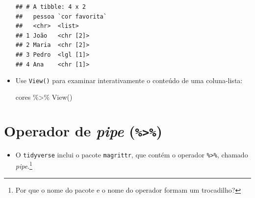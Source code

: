 \documentclass[
  11pt]{report}
\newenvironment{Shaded}{\begin{snugshade}}{\end{snugshade}}
\newcommand{\FunctionTok}[1]{\textcolor[rgb]{0.00,0.00,0.00}{#1}}
\newcommand{\NormalTok}[1]{#1}
\newcommand{\SpecialCharTok}[1]{\textcolor[rgb]{0.00,0.00,0.00}{#1}}
\providecommand{\tightlist}{%
  \setlength{\itemsep}{0pt}\setlength{\parskip}{0pt}}
\renewenvironment{Shaded}{
    \begin{mdframed}[%
      roundcorner=2pt,%
      innerleftmargin=5pt,%
      innerrightmargin=5pt,%
      topline=true,%
      leftline=true,%
      rightline=true,%
      bottomline=true,%
      linewidth=0.5pt,%
      linecolor=black!20,%
      backgroundcolor=black!2,%
      skipabove=2ex,%
      skipbelow=2.5ex%
    ]%
  }
  {
    \end{mdframed}
  }
\begin{document}
\begin{itemize}
\begin{verbatim}
## # A tibble: 4 x 2
##   pessoa `cor favorita`
##   <chr>  <list>        
## 1 João   <chr [2]>     
## 2 Maria  <chr [2]>     
## 3 Pedro  <lgl [1]>     
## 4 Ana    <chr [1]>
\end{verbatim}
\item
  Use \texttt{View()} para examinar interativamente o conteúdo de uma coluna-lista:

\begin{Shaded}
\begin{Highlighting}[]
\NormalTok{cores }\SpecialCharTok{\%\textgreater{}\%} \FunctionTok{View}\NormalTok{()}
\end{Highlighting}
\end{Shaded}
\end{itemize}

\hypertarget{operador-de-pipe}{%
\section{\texorpdfstring{Operador de \emph{pipe} (\texttt{\%\textgreater{}\%})}{Operador de pipe (\%\textgreater\%)}}\label{operador-de-pipe}}

\begin{itemize}
\tightlist
\item
  O \texttt{tidyverse} inclui o pacote \texttt{magrittr}, que contém o operador \texttt{\%\textgreater{}\%}, chamado \emph{pipe}.\footnote{Por que o nome do pacote e o nome do operador formam um trocadilho?}
\end{itemize}
\end{document}
